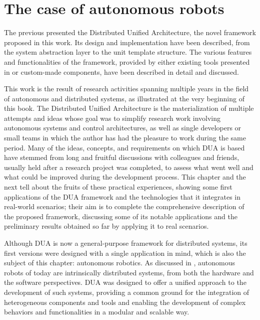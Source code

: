 \chapter{The case of autonomous robots}
\label{ch:robots}
\doublespacing
\vspace{-2.5cm}

The previous  presented the Distributed Unified Architecture, the novel framework proposed in this work. Its design and implementation have been described, from the system abstraction layer to the unit template structure. The various features and functionalities of the framework, provided by either existing tools presented in  or custom-made components, have been described in detail and discussed.

This work is the result of research activities spanning multiple years in the field of autonomous and distributed systems, as illustrated at the very beginning of this book. The Distributed Unified Architecture is the materialization of multiple attempts and ideas whose goal was to simplify research work involving autonomous systems and control architectures, as well as single developers or small teams in which the author has had the pleasure to work during the same period. Many of the ideas, concepts, and requirements on which DUA is based have stemmed from long and fruitful discussions with colleagues and friends, usually held after a research project was completed, to assess what went well and what could be improved during the development process. This chapter and the next tell about the fruits of these practical experiences, showing some first applications of the DUA framework and the technologies that it integrates in real-world scenarios; their aim is to complete the comprehensive description of the proposed framework, discussing some of its notable applications and the preliminary results obtained so far by applying it to real scenarios.

Although DUA is now a general-purpose framework for distributed systems, its first versions were designed with a single application in mind, which is also the subject of this chapter: autonomous robotics. As discussed in , autonomous robots of today are intrinsically distributed systems, from both the hardware and the software perspectives. DUA was designed to offer a unified approach to the development of such systems, providing a common ground for the integration of heterogeneous components and tools and enabling the development of complex behaviors and functionalities in a modular and scalable way.

